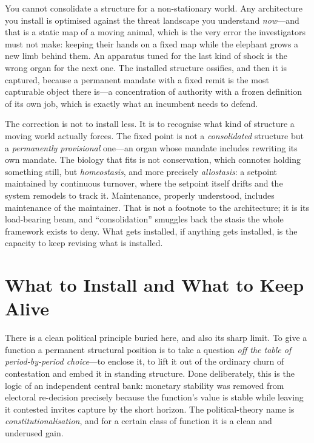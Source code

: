 \documentclass{article}
\begin{document}
You cannot consolidate a structure for a non-stationary world. Any architecture you install is optimised against the threat landscape you understand \textit{now}---and that is a static map of a moving animal, which is the very error the investigators must not make: keeping their hands on a fixed map while the elephant grows a new limb behind them. An apparatus tuned for the last kind of shock is the wrong organ for the next one. The installed structure ossifies, and then it is captured, because a permanent mandate with a fixed remit is the most capturable object there is---a concentration of authority with a frozen definition of its own job, which is exactly what an incumbent needs to defend.

The correction is not to install less. It is to recognise what kind of structure a moving world actually forces. The fixed point is not a \textit{consolidated} structure but a \textit{permanently provisional} one---an organ whose mandate includes rewriting its own mandate. The biology that fits is not conservation, which connotes holding something still, but \textit{homeostasis}, and more precisely \textit{allostasis}: a setpoint maintained by continuous turnover, where the setpoint itself drifts and the system remodels to track it. Maintenance, properly understood, includes maintenance of the maintainer. That is not a footnote to the architecture; it is its load-bearing beam, and ``consolidation'' smuggles back the stasis the whole framework exists to deny. What gets installed, if anything gets installed, is the capacity to keep revising what is installed.

\section*{What to Install and What to Keep Alive}

There is a clean political principle buried here, and also its sharp limit. To give a function a permanent structural position is to take a question \textit{off the table of period-by-period choice}---to enclose it, to lift it out of the ordinary churn of contestation and embed it in standing structure. Done deliberately, this is the logic of an independent central bank: monetary stability was removed from electoral re-decision precisely because the function's value is stable while leaving it contested invites capture by the short horizon. The political-theory name is \textit{constitutionalisation}, and for a certain class of function it is a clean and underused gain.
\end{document}
